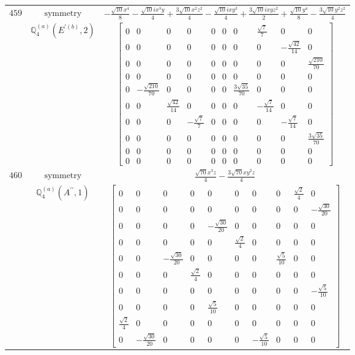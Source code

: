 \documentclass[fleqn,8pt,landscape]{jsarticle}
\begin{document}
\begin{longtable}{ccc}
$ 459 $ & $ \text{symmetry} $ & $ - \frac{\sqrt{10} x^{4}}{8} - \frac{\sqrt{10} i x^{3} y}{4} + \frac{3 \sqrt{10} x^{2} z^{2}}{4} - \frac{\sqrt{10} i x y^{3}}{4} + \frac{3 \sqrt{10} i x y z^{2}}{2} + \frac{\sqrt{10} y^{4}}{8} - \frac{3 \sqrt{10} y^{2} z^{2}}{4} $ \\
$  $ & $ \mathbb{Q}_{4}^{(a)}(E^{\prime(b)},2) $ & $ \begin{bmatrix} 0 & 0 & 0 & 0 & 0 & 0 & 0 & \frac{\sqrt{7}}{7} & 0 & 0 \\ 0 & 0 & 0 & 0 & 0 & 0 & 0 & 0 & - \frac{\sqrt{42}}{14} & 0 \\ 0 & 0 & 0 & 0 & 0 & 0 & 0 & 0 & 0 & \frac{\sqrt{210}}{70} \\ 0 & 0 & 0 & 0 & 0 & 0 & 0 & 0 & 0 & 0 \\ 0 & - \frac{\sqrt{210}}{70} & 0 & 0 & 0 & 0 & \frac{3 \sqrt{35}}{70} & 0 & 0 & 0 \\ 0 & 0 & \frac{\sqrt{42}}{14} & 0 & 0 & 0 & 0 & - \frac{\sqrt{7}}{14} & 0 & 0 \\ 0 & 0 & 0 & - \frac{\sqrt{7}}{7} & 0 & 0 & 0 & 0 & - \frac{\sqrt{7}}{14} & 0 \\ 0 & 0 & 0 & 0 & 0 & 0 & 0 & 0 & 0 & \frac{3 \sqrt{35}}{70} \\ 0 & 0 & 0 & 0 & 0 & 0 & 0 & 0 & 0 & 0 \\ 0 & 0 & 0 & 0 & 0 & 0 & 0 & 0 & 0 & 0 \end{bmatrix} $ \\ \hline
$ 460 $ & $ \text{symmetry} $ & $ \frac{\sqrt{70} x^{3} z}{4} - \frac{3 \sqrt{70} x y^{2} z}{4} $ \\
$  $ & $ \mathbb{Q}_{4}^{(a)}(A^{\prime\prime},1) $ & $ \begin{bmatrix} 0 & 0 & 0 & 0 & 0 & 0 & 0 & 0 & \frac{\sqrt{2}}{4} & 0 \\ 0 & 0 & 0 & 0 & 0 & 0 & 0 & 0 & 0 & - \frac{\sqrt{30}}{20} \\ 0 & 0 & 0 & 0 & - \frac{\sqrt{30}}{20} & 0 & 0 & 0 & 0 & 0 \\ 0 & 0 & 0 & 0 & 0 & \frac{\sqrt{2}}{4} & 0 & 0 & 0 & 0 \\ 0 & 0 & - \frac{\sqrt{30}}{20} & 0 & 0 & 0 & 0 & \frac{\sqrt{5}}{10} & 0 & 0 \\ 0 & 0 & 0 & \frac{\sqrt{2}}{4} & 0 & 0 & 0 & 0 & 0 & 0 \\ 0 & 0 & 0 & 0 & 0 & 0 & 0 & 0 & 0 & - \frac{\sqrt{5}}{10} \\ 0 & 0 & 0 & 0 & \frac{\sqrt{5}}{10} & 0 & 0 & 0 & 0 & 0 \\ \frac{\sqrt{2}}{4} & 0 & 0 & 0 & 0 & 0 & 0 & 0 & 0 & 0 \\ 0 & - \frac{\sqrt{30}}{20} & 0 & 0 & 0 & 0 & - \frac{\sqrt{5}}{10} & 0 & 0 & 0 \end{bmatrix} $ \\ \hline

\end{longtable}
\end{document}
